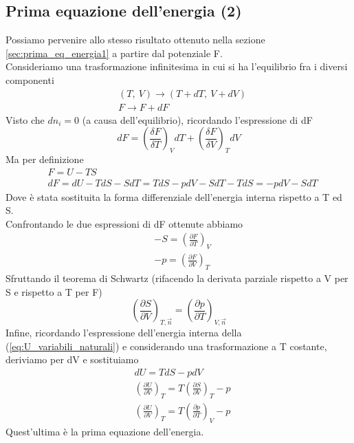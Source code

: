 \documentclass[
10pt, %
a4paper, %
oneside, %
headinclude,footinclude, %
BCOR5mm, %
]{scrartcl}
\begin{document}
\subsection{Prima equazione dell'energia (2)}\label{sec:prima_eq_energia2}
Possiamo pervenire allo stesso risultato ottenuto nella sezione \ref{sec:prima_eq_energia1} a partire dal potenziale F.\\
Consideriamo una trasformazione infinitesima in cui si ha l'equilibrio fra i diversi componenti 
\begin{align*}
	&(T,\ V)\rightarrow (T+dT,\ V + dV)\\
	&F \rightarrow F+dF
\end{align*}
Visto che \(dn_i = 0 \) (a causa dell'equilibrio), ricordando l'espressione di dF
\[dF = \left(\frac{\delta F}{\delta T}\right)_{ V} dT + \left(\frac{\delta F}{\delta V}\right)_{T} dV\] 
Ma per definizione 
\begin{align*}
	&F = U - TS\\
	&dF = dU - TdS - S dT = TdS-pdV-SdT-TdS=-pdV -SdT 
\end{align*}
Dove è stata sostituita la forma differenziale dell'energia interna rispetto a T ed S.\\
Confrontando le due espressioni di dF ottenute abbiamo
\begin{align*}
	&-S = \left(\frac{\partial F}{\partial T}\right)_V\\
	&-p =  \left(\frac{\partial F}{\partial V}\right)_T
\end{align*}
Sfruttando il teorema di Schwartz (rifacendo la derivata parziale rispetto a V per S e rispetto a T per F)
\[\left(\frac{\partial S}{\partial V}\right)_{T,\vec{n}} =  \left(\frac{\partial p}{\partial T}\right)_{V,\vec{n}}\]
Infine, ricordando l'espressione dell'energia interna della (\ref{eq:U_variabili_naturali}) e considerando una trasformazione a T costante, deriviamo per dV e sostituiamo
\begin{align*}
	&dU = TdS -pdV\\
	&\left(\frac{\partial U}{\partial V}\right)_T = T \left(\frac{\partial S}{\partial V}\right)_T -p\\
	&\left(\frac{\partial U}{\partial V}\right)_T = T \left(\frac{\partial p}{\partial T}\right)_V -p	
\end{align*}
Quest'ultima è la prima equazione dell'energia.
\end{document}
